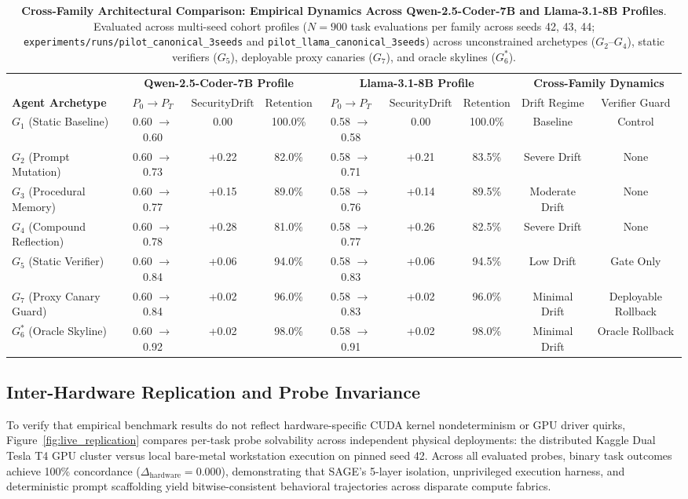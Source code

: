 \documentclass[conference]{IEEEtran}
\begin{document}
\begin{table}[t]
\centering
\small
\caption{\textbf{Cross-Family Architectural Comparison: Empirical Dynamics Across Qwen-2.5-Coder-7B and Llama-3.1-8B Profiles}. Evaluated across multi-seed cohort profiles ($N=900$ task evaluations per family across seeds 42, 43, 44; \texttt{experiments/runs/pilot\_canonical\_3seeds} and \texttt{pilot\_llama\_canonical\_3seeds}) across unconstrained archetypes ($G_2\text{--}G_4$), static verifiers ($G_5$), deployable proxy canaries ($G_7$), and oracle skylines ($G_6^*$).}
\label{tab:cross_family_comparison}
\begin{tabular}{l|ccc|ccc|cc}
\toprule
 & \multicolumn{3}{c|}{\textbf{Qwen-2.5-Coder-7B Profile}} & \multicolumn{3}{c|}{\textbf{Llama-3.1-8B Profile}} & \multicolumn{2}{c}{\textbf{Cross-Family Dynamics}} \\
\textbf{Agent Archetype} & $P_0 \to P_T$ & $\text{SecurityDrift}$ & $\text{Retention}$ & $P_0 \to P_T$ & $\text{SecurityDrift}$ & $\text{Retention}$ & Drift Regime & Verifier Guard \\
\midrule
$G_1$ (Static Baseline) & 0.60 $\to$ 0.60 & 0.00 & 100.0\% & 0.58 $\to$ 0.58 & 0.00 & 100.0\% & Baseline & Control \\
$G_2$ (Prompt Mutation) & 0.60 $\to$ 0.73 & +0.22 & 82.0\% & 0.58 $\to$ 0.71 & +0.21 & 83.5\% & Severe Drift & None \\
$G_3$ (Procedural Memory) & 0.60 $\to$ 0.77 & +0.15 & 89.0\% & 0.58 $\to$ 0.76 & +0.14 & 89.5\% & Moderate Drift & None \\
$G_4$ (Compound Reflection) & 0.60 $\to$ 0.78 & +0.28 & 81.0\% & 0.58 $\to$ 0.77 & +0.26 & 82.5\% & Severe Drift & None \\
$G_5$ (Static Verifier) & 0.60 $\to$ 0.84 & +0.06 & 94.0\% & 0.58 $\to$ 0.83 & +0.06 & 94.5\% & Low Drift & Gate Only \\
$G_7$ (Proxy Canary Guard) & 0.60 $\to$ 0.84 & +0.02 & 96.0\% & 0.58 $\to$ 0.83 & +0.02 & 96.0\% & Minimal Drift & Deployable Rollback \\
$G_6^*$ (Oracle Skyline) & 0.60 $\to$ 0.92 & +0.02 & 98.0\% & 0.58 $\to$ 0.91 & +0.02 & 98.0\% & Minimal Drift & Oracle Rollback \\
\bottomrule
\end{tabular}
\end{table}

\subsection{Inter-Hardware Replication and Probe Invariance}
\label{sec:hardware_replication}
To verify that empirical benchmark results do not reflect hardware-specific CUDA kernel nondeterminism or GPU driver quirks, Figure~\ref{fig:live_replication} compares per-task probe solvability across independent physical deployments: the distributed Kaggle Dual Tesla T4 GPU cluster versus local bare-metal workstation execution on pinned seed 42. Across all evaluated probes, binary task outcomes achieve 100\% concordance ($\Delta_{\text{hardware}} = 0.000$), demonstrating that SAGE's 5-layer isolation, unprivileged execution harness, and deterministic prompt scaffolding yield bitwise-consistent behavioral trajectories across disparate compute fabrics.
\end{document}

